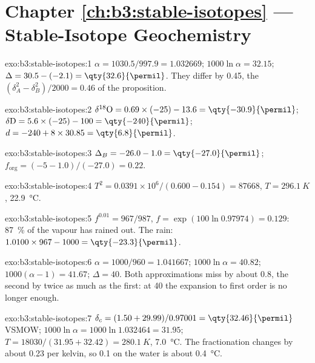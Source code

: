\section*{Chapter \ref{ch:b3:stable-isotopes} --- Stable-Isotope Geochemistry}

\begin{solution}{exo:b3:stable-isotopes:1}
$\alpha = 1030.5/997.9 = 1.032669$; $1000\ln\alpha = 32.15$; $\Delta = 30.5 -
(-2.1) = \qty{32.6}{\permil}$. They differ by \qty{0.45}{\permil}, the
$(\delta_A^2 - \delta_B^2)/2000 = 0.46$ of the proposition.
\end{solution}

\begin{solution}{exo:b3:stable-isotopes:2}
$\delta^{18}\mathrm O = 0.69\times(-25) - 13.6 = \qty{-30.9}{\permil}$;
$\delta\mathrm D = 5.6\times(-25) - 100 = \qty{-240}{\permil}$; $d = -240 +
8\times30.85 = \qty{6.8}{\permil}$.
\end{solution}

\begin{solution}{exo:b3:stable-isotopes:3}
$\Delta_B = -26.0 - 1.0 = \qty{-27.0}{\permil}$; $f_{\mathrm{org}} = (-5 -
1.0)/(-27.0) = 0.22$.
\end{solution}

\begin{solution}{exo:b3:stable-isotopes:4}
$T^2 = 0.0391\times10^6/(0.600 - 0.154) = \num{87668}$, $T = \qty{296.1}{K}$,
\qty{22.9}{\celsius}.
\end{solution}

\begin{solution}{exo:b3:stable-isotopes:5}
$f^{0.01} = 967/987$, $f = \exp(100\ln0.97974) = 0.129$: \qty{87}{\percent} of
the vapour has rained out. The rain: $1.0100\times967 - 1000 =
\qty{-23.3}{\permil}$.
\end{solution}

\begin{solution}{exo:b3:stable-isotopes:6}
$\alpha = 1000/960 = 1.041667$; $1000\ln\alpha = 40.82$; $1000(\alpha - 1) =
41.67$; $\Delta = 40$. Both approximations miss by about \qty{0.8}{\permil}, the
second by twice as much as the first: at \qty{40}{\permil} the expansion to
first order is no longer enough.
\end{solution}

\begin{solution}{exo:b3:stable-isotopes:7}
$\delta_c = (1.50 + 29.99)/0.97001 = \qty{32.46}{\permil}$ VSMOW; $1000\ln\alpha
= 1000\ln1.032464 = 31.95$; $T = 18030/(31.95 + 32.42) = \qty{280.1}{K}$,
\qty{7.0}{\celsius}. The fractionation changes by about \qty{0.23}{\permil} per
kelvin, so \qty{0.1}{\permil} on the water is about \qty{0.4}{\celsius}.
\end{solution}

